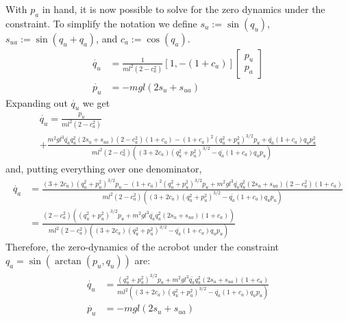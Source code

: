 With \(p_a\) in hand, it is now possible to solve for the zero dynamics under the constraint. To simplify the notation we define \(s_u := \sin(q_u)\),
\(s_{ua} := \sin(q_u + q_a)\), 
and \(c_a := \cos(q_a)\).
\begin{align*}
    \dot{q_u} &= \frac{1}{m l^2 (2 - c_a^2)} [ 1, -(1+c_a)]
    \begin{bmatrix} p_u \\ p_a \end{bmatrix} \\
    \dot{p_u} &= - m g l (2 s_u + s_{ua})
\end{align*}
Expanding out \(\dot{q_u}\) we get
\begin{multline*}
    \dot{q_u} = 
    \frac{p_u}{m l^2 (2 - c_a^2)}\\
    + \frac
    {
        m^2 g l^3 \bar{q_a}q_u^2(2s_u + s_{ua})(2 - c_a^2)(1 + c_a)
        - (1+c_a)^2(q_u^2+p_u^2)^{3/2}p_u 
        + \bar{q_a}(1+c_a)q_up_u^2
    }
    {
        ml^2 (2-c_a^2) ((3 + 2c_a)(q_u^2+p_u^2)^{3/2} - \bar{q_a}(1 + c_a)q_up_u)
    }
\end{multline*}
and, putting everything over one denominator,
\begin{align*}
    \dot{q_a} &= \frac
    {
        (3 + 2c_a)(q_u^2+p_u^2)^{3/2}p_u 
        - (1+c_a)^2(q_u^2+p_u^2)^{3/2}p_u 
        +m^2 g l^3 \bar{q_a}q_u^2(2s_u + s_{ua})(2 - c_a^2)(1 + c_a)
    }
    {
        ml^2 (2-c_a^2) ((3 + 2c_a)(q_u^2+p_u^2)^{3/2} - \bar{q_a}(1 + c_a)q_up_u)
    } \\
    &= \frac
    {
        (2-c_a^2)\left((q_u^2+p_u^2)^{3/2}p_u 
        +m^2 g l^3 \bar{q_a}q_u^2(2s_u + s_{ua})(1 + c_a)\right)
    }
    {
        ml^2 (2-c_a^2) ((3 + 2c_a)(q_u^2+p_u^2)^{3/2} - \bar{q_a}(1 + c_a)q_up_u)
    }
\end{align*}
Therefore, the zero-dynamics of the acrobot under the constraint 
\(q_a = \sin(\arctan(p_u,q_u))\) are:
\begin{align}\label{eqn:acrobot_eom_qp}
\begin{split}
    \dot{q_u} &= \frac
    {
        (q_u^2+p_u^2)^{3/2}p_u 
        +m^2 g l^3 \bar{q_a}q_u^2(2s_u + s_{ua})(1 + c_a)
    }
    {
        ml^2 \left((3 + 2c_a)(q_u^2+p_u^2)^{3/2} - \bar{q_a}(1 + c_a)q_up_u\right)
    } \\
    \dot{p_u} &= - m g l (2s_u + s_{ua})
\end{split}
\end{align}

